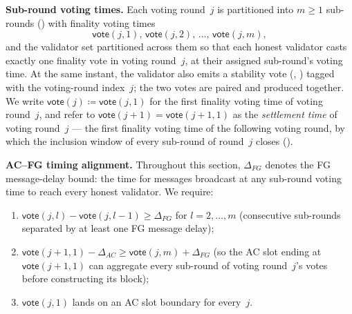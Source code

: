 \ifx\litemode\undefined\documentclass{article}\fi
\newcommand{\vote}{\ensuremath{\mathsf{vote}}}
\renewcommand{\paragraph}[1]{\vspace{7pt}\noindent\textbf{#1}}
\theoremstyle{plain}
\theoremstyle{definition}
\theoremstyle{remark}
\begin{document}
\paragraph{Sub-round voting times.}
Each voting round~$j$ is partitioned into $m \geq 1$ sub-rounds () with finality voting times
\[
  \vote(j, 1),\, \vote(j, 2),\, \ldots,\, \vote(j, m),
\]
and the validator set partitioned across them so that each honest validator casts exactly one finality vote in voting round~$j$, at their assigned sub-round's voting time. At the same instant, the validator also emits a stability vote (, ) tagged with the voting-round index~$j$; the two votes are paired and produced together.
We write $\vote(j) \coloneqq \vote(j, 1)$ for the first finality voting time of voting round~$j$, and refer to $\vote(j{+}1) = \vote(j{+}1, 1)$ as the \emph{settlement time} of voting round~$j$ --- the first finality voting time of the following voting round, by which the inclusion window of every sub-round of round~$j$ closes ().

\paragraph{AC--FG timing alignment.}
Throughout this section, $\Delta_{\mathit{FG}}$ denotes the FG message-delay bound: the time for messages broadcast at any sub-round voting time to reach every honest validator. We require:
\begin{enumerate}
  \item $\vote(j, l) - \vote(j, l-1) \geq \Delta_{\mathit{FG}}$ for $l = 2, \ldots, m$ (consecutive sub-rounds separated by at least one FG message delay);
  \item $\vote(j{+}1, 1) - \Delta_{\mathit{AC}} \geq \vote(j, m) + \Delta_{\mathit{FG}}$ (so the AC slot ending at $\vote(j{+}1, 1)$ can aggregate every sub-round of voting round~$j$'s votes before constructing its block);
  \item $\vote(j, 1)$ lands on an AC slot boundary for every~$j$.
\end{enumerate}
\end{document}
